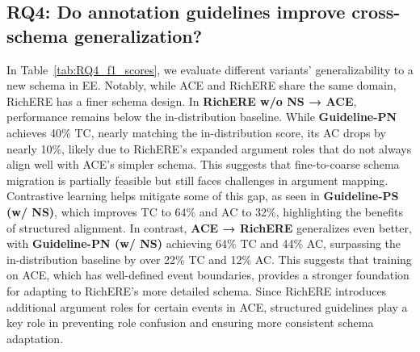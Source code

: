 \subsection{RQ4: Do annotation guidelines improve cross-schema generalization?}
In Table~\ref{tab:RQ4_f1_scores}, we evaluate different variants' generalizability to a new schema in EE. Notably, while ACE and RichERE share the same domain, RichERE has a finer schema design.
{In \textbf{RichERE w/o NS → ACE}, performance remains below the in-distribution baseline. 
While \textbf{Guideline-PN} achieves 40\% TC, nearly matching the in-distribution score, its AC drops by nearly 10\%, likely due to RichERE’s expanded argument roles that do not always align well with ACE’s simpler schema. This suggests that fine-to-coarse schema migration is partially feasible but still faces challenges in argument mapping. Contrastive learning helps mitigate some of this gap, as seen in \textbf{Guideline-PS (w/ NS)}, which improves TC to 64\% and AC to 32\%, highlighting the benefits of structured alignment. In contrast, \textbf{ACE → RichERE} generalizes even better, with \textbf{Guideline-PN (w/ NS)} achieving 64\% TC and 44\% AC, surpassing the in-distribution baseline by over 22\% TC and 12\% AC. This suggests that training on ACE, which has well-defined event boundaries, provides a stronger foundation for adapting to RichERE’s more detailed schema. Since RichERE introduces additional argument roles for certain events in ACE, structured guidelines play a key role in preventing role confusion and ensuring more consistent schema adaptation.}
